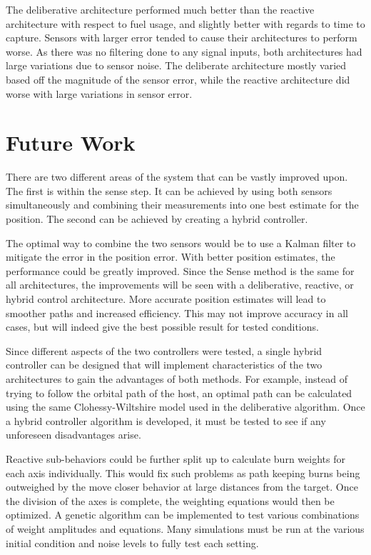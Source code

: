 \documentclass[journal, 10pt]{IEEEtran}
\begin{document}
The deliberative architecture performed much better than the reactive architecture with respect to fuel usage, and slightly better with regards to time to capture. Sensors with larger error tended to cause their architectures to perform worse. As there was no filtering done to any signal inputs, both architectures had large variations due to sensor noise. The deliberate architecture mostly varied based off the magnitude of the sensor error, while the reactive architecture did worse with large variations in sensor error. 

\section{Future Work}
There are two different areas of the system that can be vastly improved upon.  The first is within the sense step.  It can be achieved by using both sensors simultaneously and combining their measurements into one best estimate for the position.  The second can be achieved by creating a hybrid controller.

The optimal way to combine the two sensors would be to use a Kalman filter to mitigate the error in the position error.  With better position estimates, the performance could be greatly improved.  Since the Sense method is the same for all architectures, the improvements will be seen with a deliberative, reactive, or hybrid control architecture.  More accurate position estimates will lead to smoother paths and increased efficiency. This may not improve accuracy in all cases, but will indeed give the best possible result for tested conditions. 

Since different aspects of the two controllers were tested, a single hybrid controller can be designed that will implement characteristics of the two architectures to gain the advantages of both methods.  For example, instead of trying to follow the orbital path of the host, an optimal path can be calculated using the same Clohessy-Wiltshire model used in the deliberative algorithm.  Once a hybrid controller algorithm is developed, it must be tested to see if any unforeseen disadvantages arise.

Reactive sub-behaviors could be further split up to calculate burn weights for each axis individually.  This would fix such problems as path keeping burns being outweighed by the move closer behavior at large distances from the target.  Once the division of the axes is complete, the weighting equations would then be optimized.  A genetic algorithm can be implemented to test various combinations of weight amplitudes and equations.  Many simulations must be run at the various initial condition and noise levels to fully test each setting.
\end{document}
